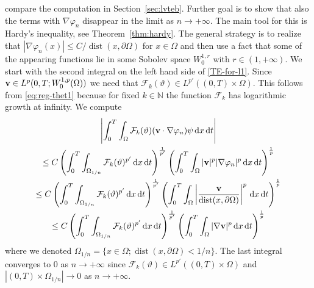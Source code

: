 \documentclass[11pt, a4paper, reqno]{amsart}
\newcommand{\N}{\mathbb N}
\numberwithin{equation}{section}
\newcommand{\vc}[1]{{\bf #1}}
\newcommand{\vv}{\vc{v}}
\newcommand{\thet}{\vartheta}
\newcommand{\dt}{\,{\rm d} t }
\newcommand{\dx}{\,{\rm d} {x}}
\newcommand{\dxdt}{\dx  \dt}
\newcommand{\intTO}[1]{\int_0^T \int_{\Omega} #1  \dxdt}
\newcommand{\dist}{\operatorname{dist}}
\newcommand{\cF}{\mathcal{F}}
\begin{document}
compare the computation in Section~\ref{sec:lvteb}. Further goal is to show that also the terms with $\nabla\varphi_n$ disappear in the limit as $n\to+\infty$. The main tool for this is Hardy's inequality, see Theorem~\ref{thm:hardy}. The general strategy is to realize that $|\nabla \varphi_n(x)|\leq C/\dist(x,\partial\Omega)$ for $x\in\Omega$ and then use a fact that some of the appearing functions lie in some Sobolev space $W^{1,r}_0$ with $r\in(1,+\infty)$.
We start with the second integral on the left hand side of \eqref{TE-for-l1}. 
 Since $\vv \in L^p(0,T;W^{1,p}_0(\Omega))$ we need that $\cF_k(\thet)\in L^{p'}((0,T)\times\Omega)$. This follows from \eqref{eq:reg-thet1} because for fixed $k\in\N$ the function $\cF_k$ has logarithmic growth at infinity. We compute
\begin{multline}
\left|\intTO{\cF_k(\thet)(\vv  \cdot \nabla\varphi_n)\psi }\right|\\
\leq
C\left(\int_0^T\int_{\Omega_{1/n}}{\cF_k(\thet)^{p'}}\dx \dt\right)^{\frac1{p'}}\left(\int_0^T\int_{\Omega}|\vv|^p |\nabla\varphi_n|^p\dx\dt\right)^{\frac1p}\\
\leq
C\left(\int_0^T\int_{\Omega_{1/n}}{\cF_k(\thet)^{p'}}\dx \dt\right)^{\frac1{p'}}\left(\int_0^T\int_{\Omega} \left|\frac{\vv}{\dist(x,\partial\Omega)}\right|^p \dx\dt\right)^{\frac1p}\\
\leq C\left(\int_0^T\int_{\Omega_{1/n}}{\cF_k(\thet)^{p'}}\dx \dt\right)^{\frac1{p'}}\left(\int_0^T\int_{\Omega}|\nabla\vv|^p \dx\dt\right)^{\frac1p}
\end{multline}
where we denoted $\Omega_{1/n}=\{x\in\Omega;\dist(x,\partial\Omega)<1/n\}$. The last integral converges to $0$ as $n\to+\infty$ since $\cF_k(\thet)\in L^{p'}((0,T)\times\Omega)$ and $|(0,T)\times\Omega_{1/n}|\to 0$ as $n\to+\infty$.
\end{document}
